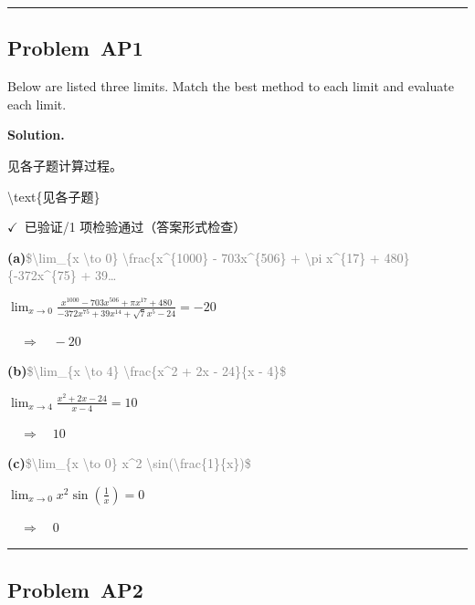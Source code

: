 \documentclass[12pt, a4paper]{article}
\newcommand{\problem}[1]{\subsection*{Problem~#1}}
\newcommand{\solution}{%
  \par\noindent
  {\color{solutiongreen}\bfseries Solution.}\par
}
\newcommand{\verifyok}{\textcolor{solutiongreen}{\ensuremath{\checkmark}\ 已验证}}
\begin{document}
\vspace{0.8em}\hrule\vspace{0.8em}

\problem{AP1}

\begin{stepbox}
Below are listed three limits. Match the best method to each limit and evaluate each limit.
\end{stepbox}

\solution

\begin{stepbox}
见各子题计算过程。
\end{stepbox}

\begin{center}
\textbackslash{}text\{见各子题\}
\end{center}

\begin{verifybox}\small \verifyok{}/1 项检验通过（答案形式检查） \end{verifybox}

\vspace{0.3em}
\textbf{(a)}\quad \textcolor{gray}{\small \$\textbackslash{}lim\_\{x \textbackslash{}to 0\} \textbackslash{}frac\{x\textasciicircum{}\{1000\} - 703x\textasciicircum{}\{506\} + \textbackslash{}pi x\textasciicircum{}\{17\} + 480\}\{-372x\textasciicircum{}\{75\} + 39…}

$\lim_{x \to 0} \frac{x^{1000} - 703 x^{506} + \pi x^{17} + 480}{- 372 x^{75} + 39 x^{14} + \sqrt{7} x^{5} - 24} = -20$

$\quad\Rightarrow\quad -20$

\textbf{(b)}\quad \textcolor{gray}{\small \$\textbackslash{}lim\_\{x \textbackslash{}to 4\} \textbackslash{}frac\{x\textasciicircum{}2 + 2x - 24\}\{x - 4\}\$}

$\lim_{x \to 4} \frac{x^{2} + 2 x - 24}{x - 4} = 10$

$\quad\Rightarrow\quad 10$

\textbf{(c)}\quad \textcolor{gray}{\small \$\textbackslash{}lim\_\{x \textbackslash{}to 0\} x\textasciicircum{}2 \textbackslash{}sin(\textbackslash{}frac\{1\}\{x\})\$}

$\lim_{x \to 0} x^{2} \sin{\left(\frac{1}{x} \right)} = 0$

$\quad\Rightarrow\quad 0$


\vspace{0.8em}\hrule\vspace{0.8em}

\problem{AP2}
\end{document}
